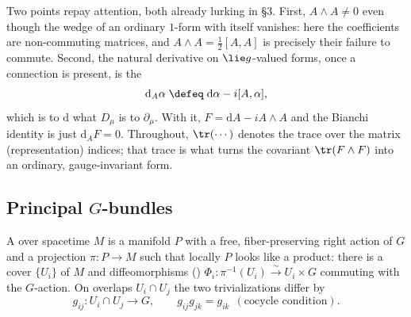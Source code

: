 \documentclass[11pt]{article}
\newcommand{\dd}{\mathrm{d}}                 %
\begin{document}
Two points repay attention, both already lurking in \S3. First, $A\wedge A\neq0$ even
though the wedge of an ordinary $1$-form with itself vanishes: here the coefficients are
non-commuting matrices, and $A\wedge A=\tfrac12[A,A]$ is precisely their failure to
commute. Second, the natural derivative on $\lie g$-valued forms, once a connection is
present, is the 
\[
\dd_A\alpha\;\defeq\;\dd\alpha-i[A,\alpha],
\]
which is to $\dd$ what $D_\mu$ is to $\partial_\mu$. With it, $F=\dd A-iA\wedge A$ and the
Bianchi identity is just $\dd_A F=0$. Throughout, $\tr(\cdots)$ denotes the trace over the
matrix (representation) indices; that trace is what turns the covariant $\tr(F\wedge F)$
into an ordinary, gauge-invariant form.

\subsection{Principal \texorpdfstring{$G$}{G}-bundles}

\begin{ddefinition}
A  over spacetime $M$ is a manifold $P$ with a free,
fiber-preserving right action of $G$ and a projection $\pi:P\to M$ such that locally
$P$ looks like a product: there is a cover $\{U_i\}$ of $M$ and diffeomorphisms
() $\Phi_i:\pi^{-1}(U_i)\xrightarrow{\;\sim\;}U_i\times G$
commuting with the $G$-action. On overlaps $U_i\cap U_j$ the two trivializations differ
by 
\[
g_{ij}:U_i\cap U_j \to G,\qquad
g_{ij}g_{jk}=g_{ik}\ \ (\text{cocycle condition}).
\]
\end{ddefinition}
\end{document}
